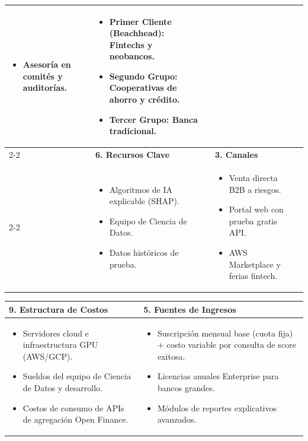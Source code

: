 \documentclass[10pt,a4paper,landscape]{article}
\begin{document}
\begin{table}[h!]
\begin{tabularx}{\linewidth}{|X|X|X|X|X|}
\begin{itemize}
    \item Asesoría en comités y auditorías.
\end{itemize} & 
\begin{itemize}
    \item \textbf{Primer Cliente (Beachhead):} Fintechs y neobancos.
    \item \textbf{Segundo Grupo:} Cooperativas de ahorro y crédito.
    \item \textbf{Tercer Grupo:} Banca tradicional.
\end{itemize} \\
\cline{2-2} \cline{4-4}
 & \rowcolor{lightgray} 
\textbf{6. Recursos Clave} & & \rowcolor{lightgray} 
\textbf{3. Canales} & \\
\cline{2-2} \cline{4-4}
 & \begin{itemize}
    \item Algoritmos de IA explicable (SHAP).
    \item Equipo de Ciencia de Datos.
    \item Datos históricos de prueba.
\end{itemize} & & \begin{itemize}
    \item Venta directa B2B a riesgos.
    \item Portal web con prueba gratis API.
    \item AWS Marketplace y ferias fintech.
\end{itemize} & \\
\hline
\end{tabularx}
\end{table}

\vspace{0.2cm}

\begin{table}[h!]
\centering
\begin{tabularx}{\linewidth}{|X|X|}
\hline
\rowcolor{lightgray}
\textbf{9. Estructura de Costos} & 
\textbf{5. Fuentes de Ingresos} \\
\hline
\begin{itemize}
    \item Servidores cloud e infraestructura GPU (AWS/GCP).
    \item Sueldos del equipo de Ciencia de Datos y desarrollo.
    \item Costos de consumo de APIs de agregación Open Finance.
\end{itemize} & 
\begin{itemize}
    \item Suscripción mensual base (cuota fija) + costo variable por consulta de score exitosa.
    \item Licencias anuales Enterprise para bancos grandes.
    \item Módulos de reportes explicativos avanzados.
\end{itemize} \\
\hline
\end{tabularx}
\end{table}
\end{document}
